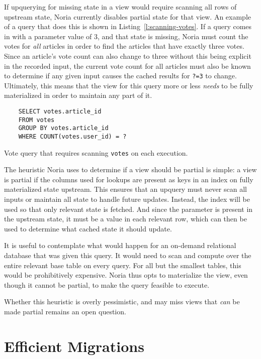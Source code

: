 If upquerying for missing state in a view would require scanning all rows of
upstream state, Noria currently disables partial state for that view. An example
of a query that does this is shown in Listing~\ref{l:scanning-votes}. If a query
comes in with a parameter value of 3, and that state is missing, Noria must
count the votes for \emph{all} articles in order to find the articles that have
exactly three votes. Since an article's vote count can also change to three
without this being explicit in the recorded input, the current vote count for
all articles must also be known to determine if any given input causes the
cached results for \texttt{?=3} to change. Ultimately, this means that the view
for this query more or less \emph{needs} to be fully materialized in order to
maintain any part of it.

\begin{listing}[h]
  \begin{verbatim}
    SELECT votes.article_id
    FROM votes
    GROUP BY votes.article_id
    WHERE COUNT(votes.user_id) = ?
  \end{verbatim}
  \caption{Vote query that requires scanning \texttt{votes} on each execution.}
  \label{l:scanning-votes}
\end{listing}

The heuristic Noria uses to determine if a view should be partial is simple: a
view is partial if the columns used for lookups are present as keys in an index
on fully materialized state upstream. This ensures that an upquery must never
scan all inputs or maintain all state to handle future updates. Instead, the
index will be used so that only relevant state is fetched. And since the
parameter is present in the upstream state, it must be a value in each relevant
row, which can then be used to determine what cached state it should update.

It is useful to contemplate what would happen for an on-demand relational
database that was given this query. It would need to scan and compute over the
entire relevant base table on every query. For all but the smallest tables, this
would be prohibitively expensive. Noria thus opts to materialize the view, even
though it cannot be partial, to make the query feasible to execute.

Whether this heuristic is overly pessimistic, and may miss views that \emph{can}
be made partial remains an open question.

\section{Efficient Migrations}

